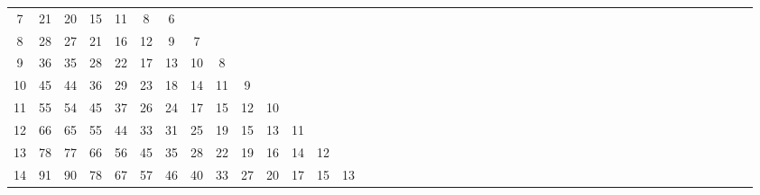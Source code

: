 \documentclass[12pt,a4paper]{amsart}
\theoremstyle{definition} %
\theoremstyle{plain} %
\begin{document}
\begin{table}[h]
{\begin{tabular}{|c|*{44}{c|}}
            7 &  21 &  20 &  15 &  11 &   8 &   6 &     &     &     &      &      &      &      &      &      &      &      &      &      &      &      &      &      &      &      &      &      &      &      &      &      &      &      &      &      &      &      &      &      &      &      &      &      &      \\
            8 &  28 &  27 &  21 &  16 &  12 &   9 &   7 &     &     &      &      &      &      &      &      &      &      &      &      &      &      &      &      &      &      &      &      &      &      &      &      &      &      &      &      &      &      &      &      &      &      &      &      &      \\
            9 &  36 &  35 &  28 &  22 &  17 &  13 &  10 &   8 &     &      &      &      &      &      &      &      &      &      &      &      &      &      &      &      &      &      &      &      &      &      &      &      &      &      &      &      &      &      &      &      &      &      &      &      \\
            10 &  45 &  44 &  36 &  29 &  23 &  18 &  14 &  11 &   9 &      &      &      &      &      &      &      &      &      &      &      &      &      &      &      &      &      &      &      &      &      &      &      &      &      &      &      &      &      &      &      &      &      &      &      \\
            11 &  55 &  54 &  45 &  37 &  26 &  24 &  17 &  15 &  12 &   10 &      &      &      &      &      &      &      &      &      &      &      &      &      &      &      &      &      &      &      &      &      &      &      &      &      &      &      &      &      &      &      &      &      &      \\
            12 &  66 &  65 &  55 &  44 &  33 &  31 &  25 &  19 &  15 &   13 &   11 &      &      &      &      &      &      &      &      &      &      &      &      &      &      &      &      &      &      &      &      &      &      &      &      &      &      &      &      &      &      &      &      &      \\
            13 &  78 &  77 &  66 &  56 &  45 &  35 &  28 &  22 &  19 &   16 &   14 &   12 &      &      &      &      &      &      &      &      &      &      &      &      &      &      &      &      &      &      &      &      &      &      &      &      &      &      &      &      &      &      &      &      \\
            14 &  91 &  90 &  78 &  67 &  57 &  46 &  40 &  33 &  27 &   20 &   17 &   15 &   13 &      &      &      &      &      &      &      &      &      &      &      &      &      &      &      &      &      &      &      &      &      &      &      &      &      &      &      &      &      &      &      \\

\end{tabular}}
\end{table}
\end{document}
